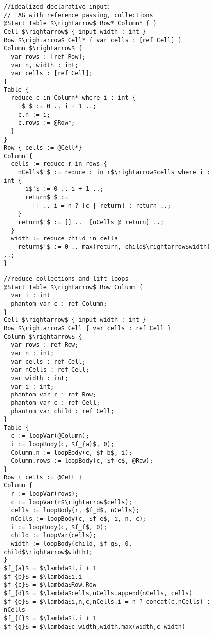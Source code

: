 

\begin{figure}
\begin{lstlisting}[mathescape]
//idealized declarative input: 
//  AG with reference passing, collections
@Start Table $\rightarrow$ Row* Column* { }
Cell $\rightarrow$ { input width : int }
Row $\rightarrow$ Cell* { var cells : [ref Cell] }
Column $\rightarrow$ { 
  var rows : [ref Row];
  var n, width : int;
  var cells : [ref Cell]; 
}
Table { 
  reduce c in Column* where i : int {
    i$'$ := 0 .. i + 1 ..;
    c.n := i;
    c.rows := @Row*;
  } 
}
Row { cells := @Cell*}
Column { 
  cells := reduce r in rows {
    nCells$'$ := reduce c in r$\rightarrow$cells where i : int {
      i$'$ := 0 .. i + 1 ..;
      return$'$ := 
        [] .. i = n ? [c | return] : return ..;
    }
    return$'$ := [] ..  [nCells @ return] ..;
  }
  width := reduce child in cells
    return$'$ := 0 .. max(return, child$\rightarrow$width) ..;
}
\end{lstlisting}

\begin{lstlisting}[mathescape]
//reduce collections and lift loops
@Start Table $\rightarrow$ Row Column { 
  var i : int 
  phantom var c : ref Column;
}
Cell $\rightarrow$ { input width : int }
Row $\rightarrow$ Cell { var cells : ref Cell }
Column $\rightarrow$ {   
  var rows : ref Row;
  var n : int;
  var cells : ref Cell;
  var nCells : ref Cell;
  var width : int; 
  var i : int;  
  phantom var r : ref Row;
  phantom var c : ref Cell;
  phantom var child : ref Cell;
}
Table {  
  c := loopVar(@Column);
  i := loopBody(c, $f_{a}$, 0);
  Column.n := loopBody(c, $f_b$, i);
  Column.rows := loopBody(c, $f_c$, @Row);
}
Row { cells := @Cell }
Column { 
  r := loopVar(rows);
  c := loopVar(r$\rightarrow$cells);  
  cells := loopBody(r, $f_d$, nCells);
  nCells := loopBody(c, $f_e$, i, n, c);
  i := loopBody(c, $f_f$, 0);
  child := loopVar(cells);
  width := loopBody(child, $f_g$, 0, child$\rightarrow$width);  
}
$f_{a}$ = $\lambda$i.i + 1
$f_{b}$ = $\lambda$i.i
$f_{c}$ = $\lambda$Row.Row
$f_{d}$ = $\lambda$cells,nCells.append(nCells, cells)
$f_{e}$ = $\lambda$i,n,c,nCells.i = n ? concat(c,nCells) : nCells
$f_{f}$ = $\lambda$i.i + 1
$f_{g}$ = $\lambda$c_width,width.max(width,c_width)
\end{lstlisting}
\end{figure}

